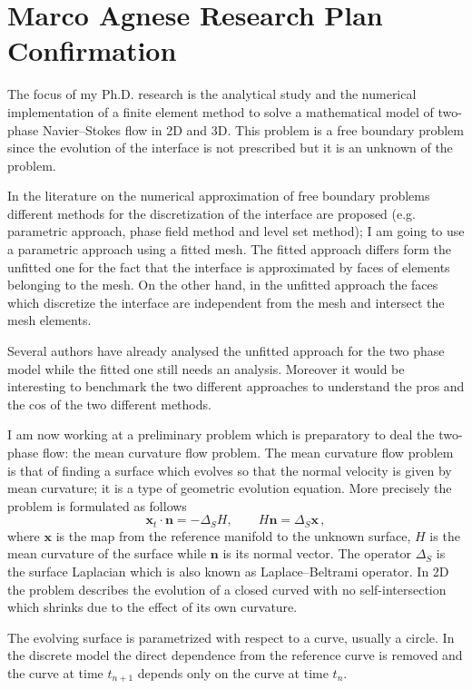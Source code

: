 \documentclass[a4paper,12pt]{report}
\newcommand{\gr}[1]{\textbf{#1}}
\begin{document}
\section*{Marco Agnese Research Plan Confirmation}
The focus of my Ph.D. research is the analytical study and the numerical implementation of a finite element method to solve a mathematical model of two-phase Navier--Stokes flow in 2D and 3D. This problem is a free boundary problem since the evolution of the interface is not prescribed but it is an unknown of the problem. 

In the literature on the numerical approximation of free boundary problems different methods for the discretization of the interface are proposed (e.g. parametric approach, phase field method and level set method); I am going to use a parametric approach using a fitted mesh. The fitted approach differs form the unfitted one for the fact that the interface is approximated by faces of elements belonging to the mesh. On the other hand, in the unfitted approach the faces which discretize the interface are independent from the mesh and intersect the mesh elements. 

Several authors have already analysed the unfitted approach for the two phase model while the fitted one still needs an analysis. Moreover it would be interesting to benchmark the two different approaches to understand the pros and the cos of the two different methods.
\newline

I am now working at a preliminary problem which is preparatory to deal the two-phase flow: the mean curvature flow problem. The mean curvature flow problem is that of finding a surface which evolves so that the normal velocity is given by mean curvature; it is a type of geometric evolution equation. More precisely the problem is formulated as follows
\begin{equation}
 \gr{x}_t\cdot\gr{n}=-\Delta_SH,\qquad H\gr{n}=\Delta_S\gr{x} \,,
\end{equation}
where $\gr{x}$ is the map from the reference manifold to the unknown surface, $H$ is the mean curvature of the surface while $\gr{n}$ is its normal vector. The operator $\Delta_S$ is the surface Laplacian which is also known as Laplace--Beltrami operator. In 2D the problem describes the evolution of a closed curved with no self-intersection which shrinks due to the effect of its own curvature.

The evolving surface is parametrized with respect to a curve, usually a circle. In the discrete model the direct dependence from the reference curve is removed and the curve at time $t_{n+1}$ depends only on the curve at time $t_n$.
\newline
\end{document}
